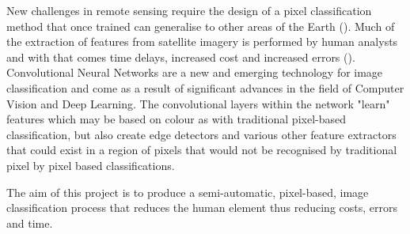 New challenges in remote sensing require the design of a pixel classification method that once trained can generalise to other areas of the Earth (\cite{maggiori17a}). Much of the extraction of features from satellite imagery is performed by human analysts and with that comes time delays, increased cost and increased errors (\cite{mnih13}).
Convolutional Neural Networks are a new and emerging technology for image classification and come as a result of significant advances in the field of Computer Vision and Deep Learning. The convolutional layers within the network "learn" features which may be based on colour as with traditional pixel-based classification, but also create edge detectors and various other feature extractors that could exist in a region of pixels that would not be recognised by traditional pixel by pixel based classifications.
\par
The aim of this project is to produce a semi-automatic, pixel-based, image classification process that reduces the human element thus reducing costs, errors and time.

